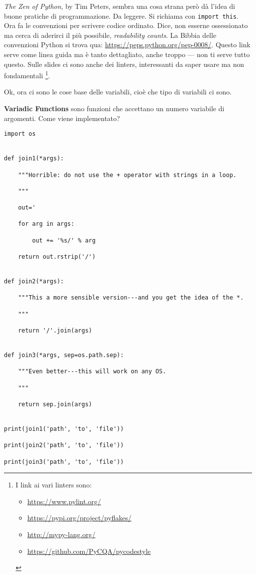 \documentclass[10pt, a4paper, titlepage]{book}
\begin{document}
\emph{The Zen of Python}, by Tim Peters, sembra una cosa strana però dà l'idea di buone pratiche di programmazione. Da leggere. Si richiama con \texttt{import this}.
Ora fa le convenzioni per scrivere codice ordinato. Dice, non esserne ossessionato ma cerca di aderirci il più possibile, \textit{readability counts}.
La Bibbia delle convenzioni Python si trova qua: \url{https://peps.python.org/pep-0008/}. 
Questo link serve come linea guida ma è tanto dettagliato, anche troppo --- non ti serve tutto questo.
Sulle slides ci sono anche dei linters, interessanti da saper usare ma non fondamentali
\footnote{
I link ai vari linters sono: 
	\begin{itemize}
		\item \url{https://www.pylint.org/}
		\item \url{https://pypi.org/project/pyflakes/}
		\item \url{http://mypy-lang.org/}
		\item \url{https://github.com/PyCQA/pycodestyle}
	\end{itemize}
}.


Ok, ora ci sono le cose base delle variabili, cioè che tipo di variabili ci sono.

\textbf{Variadic Functions} sono funzioni che accettano un numero variabile di argomenti. Come viene implementato?

\begin{verbatim}
import os


def join1(*args):

	"""Horrible: do not use the + operator with strings in a loop.

	"""

	out='

	for arg in args:

		out += '%s/' % arg

	return out.rstrip('/')


def join2(*args):

	"""This a more sensible version---and you get the idea of the *.

	"""

	return '/'.join(args)


def join3(*args, sep=os.path.sep):

	"""Even better---this will work on any OS.

	"""

	return sep.join(args)


print(join1('path', 'to', 'file'))

print(join2('path', 'to', 'file'))

print(join3('path', 'to', 'file'))
\end{verbatim}
\end{document}
